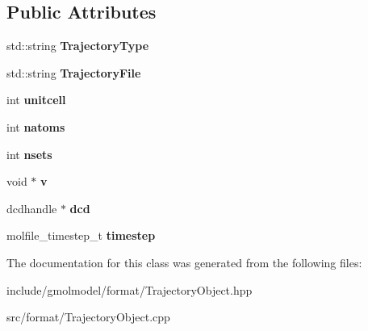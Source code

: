 \subsection*{Public Attributes}
\begin{DoxyCompactItemize}
\item 
std\+::string {\bfseries Trajectory\+Type}\hypertarget{classTrajectoryObject_a7cc2cb2c265a2d36843e6b20035862e6}{}\label{classTrajectoryObject_a7cc2cb2c265a2d36843e6b20035862e6}

\item 
std\+::string {\bfseries Trajectory\+File}\hypertarget{classTrajectoryObject_ae1e1a2d970547a29f5a8f18e0afd6186}{}\label{classTrajectoryObject_ae1e1a2d970547a29f5a8f18e0afd6186}

\item 
int {\bfseries unitcell}\hypertarget{classTrajectoryObject_a0a40865644b880a1dcf478ee6ca0ed97}{}\label{classTrajectoryObject_a0a40865644b880a1dcf478ee6ca0ed97}

\item 
int {\bfseries natoms}\hypertarget{classTrajectoryObject_a76af41f4cd54ce63958f807a47f9e2d1}{}\label{classTrajectoryObject_a76af41f4cd54ce63958f807a47f9e2d1}

\item 
int {\bfseries nsets}\hypertarget{classTrajectoryObject_af0a213c69f40fa78fb1db97f89f3f6ef}{}\label{classTrajectoryObject_af0a213c69f40fa78fb1db97f89f3f6ef}

\item 
void $\ast$ {\bfseries v}\hypertarget{classTrajectoryObject_aba09f3a79f52cad3cd295e3309262658}{}\label{classTrajectoryObject_aba09f3a79f52cad3cd295e3309262658}

\item 
dcdhandle $\ast$ {\bfseries dcd}\hypertarget{classTrajectoryObject_a305342c9315781e5643b35e7395e8e65}{}\label{classTrajectoryObject_a305342c9315781e5643b35e7395e8e65}

\item 
molfile\+\_\+timestep\+\_\+t {\bfseries timestep}\hypertarget{classTrajectoryObject_a3465a38593cbcbf97c608531c11619b2}{}\label{classTrajectoryObject_a3465a38593cbcbf97c608531c11619b2}

\end{DoxyCompactItemize}


The documentation for this class was generated from the following files\+:\begin{DoxyCompactItemize}
\item 
include/gmolmodel/format/Trajectory\+Object.\+hpp\item 
src/format/Trajectory\+Object.\+cpp\end{DoxyCompactItemize}
